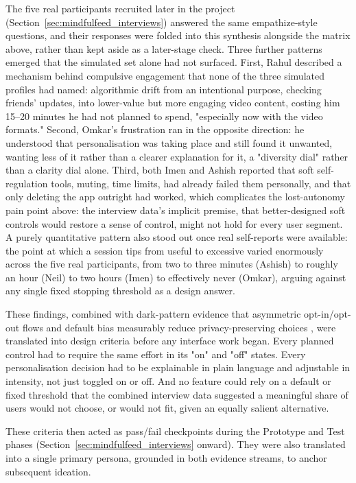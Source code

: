 \documentclass[11pt]{article}
\begin{document}
The five real participants recruited later in the project (Section~\ref{sec:mindfulfeed_interviews}) answered the same empathize-style questions, and their responses were folded into this synthesis alongside the matrix above, rather than kept aside as a later-stage check. Three further patterns emerged that the simulated set alone had not surfaced. First, Rahul described a mechanism behind compulsive engagement that none of the three simulated profiles had named: algorithmic drift from an intentional purpose, checking friends' updates, into lower-value but more engaging video content, costing him 15--20 minutes he had not planned to spend, "especially now with the video formats." Second, Omkar's frustration ran in the opposite direction: he understood that personalisation was taking place and still found it unwanted, wanting less of it rather than a clearer explanation for it, a "diversity dial" rather than a clarity dial alone. Third, both Imen and Ashish reported that soft self-regulation tools, muting, time limits, had already failed them personally, and that only deleting the app outright had worked, which complicates the lost-autonomy pain point above: the interview data's implicit premise, that better-designed soft controls would restore a sense of control, might not hold for every user segment. A purely quantitative pattern also stood out once real self-reports were available: the point at which a session tips from useful to excessive varied enormously across the five real participants, from two to three minutes (Ashish) to roughly an hour (Neil) to two hours (Imen) to effectively never (Omkar), arguing against any single fixed stopping threshold as a design answer.

These findings, combined with dark-pattern evidence that asymmetric opt-in/opt-out flows and default bias measurably reduce privacy-preserving choices \parencites[2]{4807303}, were translated into design criteria before any interface work began. Every planned control had to require the same effort in its "on" and "off" states. Every personalisation decision had to be explainable in plain language and adjustable in intensity, not just toggled on or off. And no feature could rely on a default or fixed threshold that the combined interview data suggested a meaningful share of users would not choose, or would not fit, given an equally salient alternative.

These criteria then acted as pass/fail checkpoints during the Prototype and Test phases (Section~\ref{sec:mindfulfeed_interviews} onward). They were also translated into a single primary persona, grounded in both evidence streams, to anchor subsequent ideation.
\end{document}
